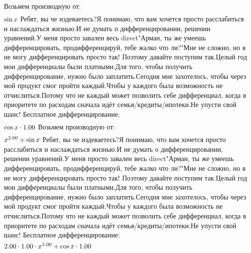Возьмем производную от:
\begin{gather}
\end{gather}
\begin{math}
\sin x \\
\end{math}
Ребят, вы че издеваетесь?Я понимаю, что вам хочется просто расслабиться и наслаждаться жизнью.И не думать о дифференцировании, решении уравнений.У меня просто завален весь direct"Арман, ты же умеешь дифференцировать, продифференцируй, тебе жалко что ли?"Мне не сложно, но я не могу дифференцировать просто так! Поэтому давайте поступим так.Целый год мои дифференциалы были платными.Для того, чтобы получить дифференцирование, нужно было заплатить.Сегодня мне захотелось, чтобы через мой продукт смог пройти каждый.Чтобы у каждого была возможность не отчислиться.Потому что не каждый может позволить себе дифференциал, когда в приоритете по расходам сначала идёт семья/кредиты/ипотеки.Не упусти свой шанс! Бесплатное дифференцирование: 
\begin{gather}
\end{gather}
\begin{math}
\cos x \cdot 1.00 \\
\end{math}
Возьмем производную от:
\begin{gather}
\end{gather}
\begin{math}
x ^ {2.00 }+ \sin x \\
\end{math}
Ребят, вы че издеваетесь?Я понимаю, что вам хочется просто расслабиться и наслаждаться жизнью.И не думать о дифференцировании, решении уравнений.У меня просто завален весь direct"Арман, ты же умеешь дифференцировать, продифференцируй, тебе жалко что ли?"Мне не сложно, но я не могу дифференцировать просто так! Поэтому давайте поступим так.Целый год мои дифференциалы были платными.Для того, чтобы получить дифференцирование, нужно было заплатить.Сегодня мне захотелось, чтобы через мой продукт смог пройти каждый.Чтобы у каждого была возможность не отчислиться.Потому что не каждый может позволить себе дифференциал, когда в приоритете по расходам сначала идёт семья/кредиты/ипотеки.Не упусти свой шанс! Бесплатное дифференцирование: 
\begin{gather}
\end{gather}
\begin{math}
2.00 \cdot 1.00 \cdot x ^ {1.00 }+ \cos x \cdot 1.00 \\
\end{math}
